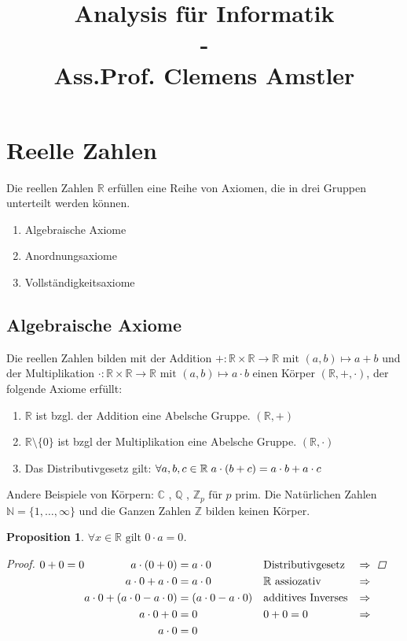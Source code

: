 \documentclass[a4paper,titlepage,oneside]{article}
\title{Analysis für Informatik\small{ \\ - \\ Ass.Prof. Clemens Amstler}}
\def\C{\ensuremath{\mathbb{C}} }
\def\N{\ensuremath{\mathbb{N}} }
\def\Q{\ensuremath{\mathbb{Q}} }
\def\Z{\ensuremath{\mathbb{Z}} }
\def\R{\ensuremath{\mathbb{R}} }
\def\fa{\ensuremath{\forall}}
\def\sp{\hspace{0,1cm}}
\theoremstyle{thmstyle}
\theoremstyle{subthmstyle}
\newtheorem{subprop}[subsatz]{Proposition}
\begin{document}
\onehalfspace

\maketitle

\tableofcontents


\section{Reelle Zahlen}
Die reellen Zahlen \R erfüllen eine Reihe von Axiomen, die in drei Gruppen unterteilt werden können.

\begin{enumerate}[label=\Roman*.]
	\item Algebraische Axiome
	\item Anordnungsaxiome
	\item Vollständigkeitsaxiome
\end{enumerate}

\subsection{Algebraische Axiome}
Die reellen Zahlen bilden mit der Addition \( + : \R \times \R \to \R \text{ mit } (a,b) \mapsto a + b\) und der Multiplikation \( \cdot :  \R \times \R \to \R \text{ mit } (a,b) \mapsto a \cdot b \)
einen Körper \((\R, +, \cdot )\), der folgende Axiome erfüllt:
\begin{enumerate}[label=\arabic*)]
	\item \(\R\) ist bzgl. der Addition eine Abelsche Gruppe. \((\R,+)\)
	\item \(\R \setminus \{0\}\) ist bzgl der Multiplikation eine Abelsche Gruppe. \((\R,\cdot)\)
	\item Das Distributivgesetz gilt: \( \fa a,b,c \in \R \sp a \cdot (b + c) = a \cdot b + a \cdot c\)
\end{enumerate}
Andere Beispiele von Körpern: \C, \Q, \(\Z_p \text{ für }p\) prim.
Die Natürlichen Zahlen \(\N = \{1,\dots,\infty \} \) und die Ganzen Zahlen \Z bilden keinen Körper.

\begin{subprop}
\(\fa x \in \R \text{ gilt } 0 \cdot a = 0\).
\begin{proof}
\begin{math}
0+0 = 0 \begin{aligned}[t] a \cdot ( 0 + 0 ) &= a \cdot 0 					&&\text{Distributivgesetz } &\Rightarrow \\
					a \cdot 0 + a \cdot 0 &= a \cdot 0 				&&\text{\R assiozativ} &\Rightarrow\\
					a \cdot 0 + (a \cdot 0 - a \cdot 0) &= (a \cdot 0 - a \cdot 0) 	&& \text{additives Inverses} &\Rightarrow\\
					a \cdot 0 +  0 &= 0	 					&& 0+0 = 0 &\Rightarrow\\
					a \cdot 0 &= 0 \end{aligned}\\
\end{math}
\end{proof}
\end{subprop}
\end{document}
